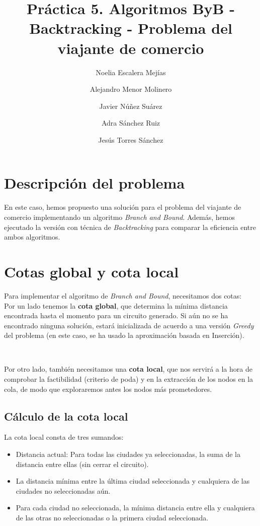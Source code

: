 \documentclass{article}
\title{Práctica 5. Algoritmos ByB - Backtracking - Problema del viajante de comercio}
\author{Noelia Escalera Mejías \\
	\and Alejandro Menor Molinero \\
	\and Javier Núñez Suárez \\
	\and Adra Sánchez Ruiz \\
	\and Jesús Torres Sánchez}
\begin{document}
	\maketitle
	\section{Descripción del problema}
	En este caso, hemos propuesto una solución para el problema del viajante de comercio implementando un algoritmo \textit{Branch and Bound}. Además, hemos ejecutado la versión con técnica de \textit{Backtracking} para comparar la eficiencia entre ambos algoritmos.
	
	\section{Cotas global y cota local}
	Para implementar el algoritmo de \textit{Branch and Bound}, necesitamos dos cotas: 
	\\
	
	Por un lado tenemos la \textbf{cota global}, que determina la mínima distancia encontrada hasta el momento para un circuito generado. Si aún no se ha encontrado ninguna solución, estará inicializada de acuerdo a una versión \textit{Greedy} del problema (en este caso, se ha usado la aproximación basada en Inserción).
	
	\
	
	Por otro lado, también necesitamos una \textbf{cota local}, que nos servirá a la hora de comprobar la factibilidad (criterio de poda) y en la extracción de los nodos en la cola, de modo que exploraremos antes los nodos más prometedores.
	\subsection{Cálculo de la cota local}
	La cota local consta de tres sumandos:
	\begin{itemize}
		\item Distancia actual: Para todas las ciudades ya seleccionadas, la suma de la distancia entre ellas (sin cerrar el circuito).
		\item La distancia mínima entre la última ciudad seleccionada y cualquiera de las ciudades no seleccionadas aún.
		\item Para cada ciudad no seleccionada, la mínima distancia entre ella y cualquiera de las otras no seleccionadas o la primera ciudad seleccionada.
	\end{itemize}
	
\end{document}
